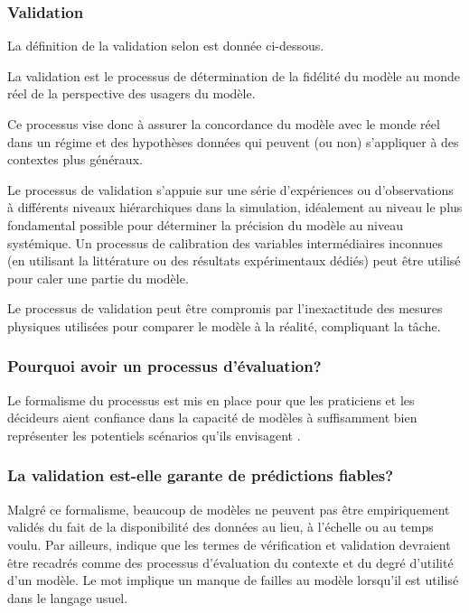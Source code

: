         \subsubsection{Validation}
            La définition de la validation selon \textcite{national_research_council_assessing_2012} est donnée ci-dessous.
            \begin{definition}
                La validation est le processus de détermination de la fidélité du modèle au monde réel de la perspective des usagers du modèle.
            \end{definition}
            Ce processus vise donc à assurer la concordance du modèle avec le monde réel dans un régime et des hypothèses données qui peuvent (ou non) s'appliquer à des contextes plus généraux. \par
            Le processus de validation s'appuie sur une série d'expériences ou d'observations à différents niveaux hiérarchiques dans la simulation, idéalement au niveau le plus fondamental possible pour déterminer la précision du modèle au niveau systémique. Un processus de calibration des variables intermédiaires inconnues (en utilisant la littérature ou des résultats expérimentaux dédiés) peut être utilisé pour caler une partie du modèle. \par
            Le processus de validation peut être compromis par l'inexactitude des mesures physiques utilisées pour comparer le modèle à la réalité, compliquant la tâche.\par
        \subsubsection{Pourquoi avoir un processus d'évaluation?}
            Le formalisme du processus est mis en place pour que les praticiens et les décideurs aient confiance dans la capacité de modèles à suffisamment bien représenter les potentiels scénarios qu'ils envisagent \parencite{national_research_council_assessing_2012,national_research_council_behavioral_2008,transportation_research_board_travel_2012}. 
        \subsubsection{La validation est-elle garante de prédictions fiables?}    
            Malgré ce formalisme, beaucoup de modèles ne peuvent pas être empiriquement validés du fait de la disponibilité des données au lieu, à l'échelle ou au temps voulu. Par ailleurs, \textcite{oreskes_evaluation_1998} indique que les termes de vérification et validation devraient être recadrés comme des processus d'évaluation du contexte et du degré d'utilité d'un modèle. Le mot \fg{} implique un manque de failles au modèle lorsqu'il est utilisé dans le langage usuel. \par
            
